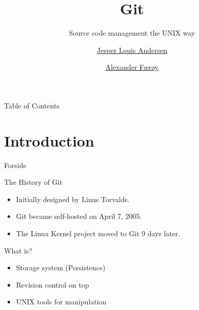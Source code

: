 \documentclass[xcolor=pdftex,dvipsnames]{beamer}
\title{Git}
\subtitle{Source code management the UNIX way}
\author{\href{mailto:jesper.louis.andersen@gmail.com}{Jesper Louis Andersen}
        \and
        \href{mailto:ahf@0x90.dk}{Alexander Færøy}}
\begin{document}
\frame{\titlepage}

\begin{frame}{Table of Contents}
    \tableofcontents
\end{frame}

\section{Introduction}
\begin{frame}{Forside}\end{frame}
\begin{frame}{The History of Git}
    \begin{itemize}
        \item Initially designed by Linus Torvalds.
        \item Git became self-hosted on April 7, 2005.
        \item The Linux Kernel project moved to Git 9 days later.
    \end{itemize}
\end{frame}
\begin{frame}{What is?}
  \begin{itemize}
  \item Storage system (Persistence)
  \item Revision control on top
  \item UNIX tools for manipulation
  \end{itemize}
\end{frame}
\end{document}
